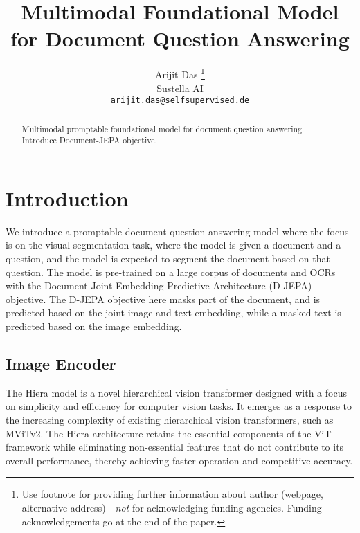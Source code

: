 \documentclass{article} %
\title{Multimodal Foundational Model for Document Question Answering}
\author{Arijit Das \thanks{ Use footnote for providing further information
about author (webpage, alternative address)---\emph{not} for acknowledging
funding agencies.  Funding acknowledgements go at the end of the paper.} \\
Sustella AI\\
\texttt{arijit.das@selfsupervised.de}
}
\begin{document}
\maketitle

\begin{abstract}
Multimodal promptable foundational model for document question answering. Introduce Document-JEPA objective. 
\end{abstract}

\section{Introduction}

We introduce a promptable document question answering model where the focus is on the visual segmentation task, where the model is given a document and a question, and the model is expected to segment the document based on that question. The model is pre-trained on a large corpus of documents and OCRs with the Document Joint Embedding Predictive Architecture (D-JEPA) objective. The D-JEPA objective here masks part of the document, and is predicted based on the joint image and text embedding, while a masked text is predicted based on the image embedding.


\subsection{Image Encoder}
The Hiera model is a novel hierarchical vision transformer designed with a focus on simplicity and efficiency for computer vision tasks. It emerges as a response to the increasing complexity of existing hierarchical vision transformers, such as MViTv2. The Hiera architecture retains the essential components of the ViT framework while eliminating non-essential features that do not contribute to its overall performance, thereby achieving faster operation and competitive accuracy.
\end{document}
